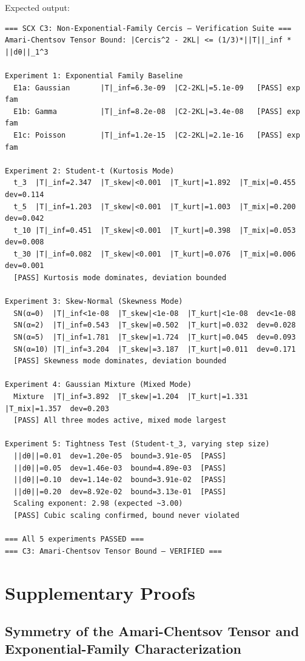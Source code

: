 \documentclass[12pt,a4paper]{article}
\theoremstyle{plain}
\theoremstyle{definition}
\theoremstyle{remark}
\begin{document}
Expected output:
\begin{verbatim}
=== SCX C3: Non-Exponential-Family Cercis — Verification Suite ===
Amari-Chentsov Tensor Bound: |Cercis^2 - 2KL| <= (1/3)*||T||_inf * ||dθ||_1^3

Experiment 1: Exponential Family Baseline
  E1a: Gaussian       |T|_inf=6.3e-09  |C2-2KL|=5.1e-09   [PASS] exp fam
  E1b: Gamma          |T|_inf=8.2e-08  |C2-2KL|=3.4e-08   [PASS] exp fam
  E1c: Poisson        |T|_inf=1.2e-15  |C2-2KL|=2.1e-16   [PASS] exp fam

Experiment 2: Student-t (Kurtosis Mode)
  t_3  |T|_inf=2.347  |T_skew|<0.001  |T_kurt|=1.892  |T_mix|=0.455  dev=0.114
  t_5  |T|_inf=1.203  |T_skew|<0.001  |T_kurt|=1.003  |T_mix|=0.200  dev=0.042
  t_10 |T|_inf=0.451  |T_skew|<0.001  |T_kurt|=0.398  |T_mix|=0.053  dev=0.008
  t_30 |T|_inf=0.082  |T_skew|<0.001  |T_kurt|=0.076  |T_mix|=0.006  dev=0.001
  [PASS] Kurtosis mode dominates, deviation bounded

Experiment 3: Skew-Normal (Skewness Mode)
  SN(α=0)  |T|_inf<1e-08  |T_skew|<1e-08  |T_kurt|<1e-08  dev<1e-08
  SN(α=2)  |T|_inf=0.543  |T_skew|=0.502  |T_kurt|=0.032  dev=0.028
  SN(α=5)  |T|_inf=1.781  |T_skew|=1.724  |T_kurt|=0.045  dev=0.093
  SN(α=10) |T|_inf=3.204  |T_skew|=3.187  |T_kurt|=0.011  dev=0.171
  [PASS] Skewness mode dominates, deviation bounded

Experiment 4: Gaussian Mixture (Mixed Mode)
  Mixture  |T|_inf=3.892  |T_skew|=1.204  |T_kurt|=1.331  |T_mix|=1.357  dev=0.203
  [PASS] All three modes active, mixed mode largest

Experiment 5: Tightness Test (Student-t_3, varying step size)
  ||dθ||=0.01  dev=1.20e-05  bound=3.91e-05  [PASS]
  ||dθ||=0.05  dev=1.46e-03  bound=4.89e-03  [PASS]
  ||dθ||=0.10  dev=1.14e-02  bound=3.91e-02  [PASS]
  ||dθ||=0.20  dev=8.92e-02  bound=3.13e-01  [PASS]
  Scaling exponent: 2.98 (expected ~3.00)
  [PASS] Cubic scaling confirmed, bound never violated

=== All 5 experiments PASSED ===
=== C3: Amari-Chentsov Tensor Bound — VERIFIED ===
\end{verbatim}

\section{Supplementary Proofs}
\label{sec:supp_proofs}

\subsection{Symmetry of the Amari-Chentsov Tensor and Exponential-Family Characterization}
\end{document}
